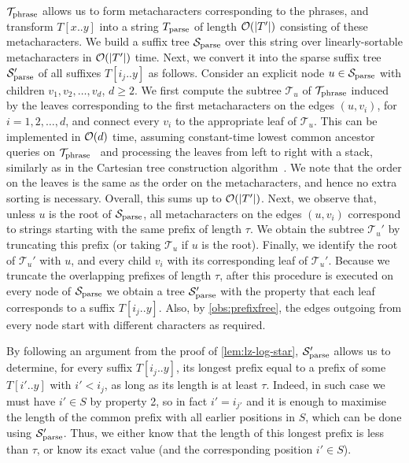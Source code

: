 $\mathcal{T}_{\mathrm{phrase}}$ allows us to form metacharacters corresponding to the phrases, and transform $T[x..y]$ into a string $T_{\mathrm{parse}}$
of length $\mathcal{O}(|T'|)$ consisting of these metacharacters.
We build a suffix tree $\mathcal{S}_{\mathrm{parse}}$ over this
string over linearly-sortable metacharacters in $\mathcal{O}(|T'|)$ time. Next, we convert it into the sparse suffix tree
$\mathcal{S}_{\mathrm{parse}}'$ of all suffixes $T[i_{j}..y]$ as follows. Consider an explicit node $u\in\mathcal{S}_{\mathrm{parse}}$ with children $v_{1},v_{2},\ldots,v_{d}$,
$d\geq 2$. We first compute the subtree $\mathcal{T}_{u}$ of $\mathcal{T}_{\mathrm{phrase}}$ induced by the leaves corresponding to the first metacharacters
on the edges $(u,v_{i})$, for $i=1,2,\ldots,d$, and connect every $v_{i}$ to the appropriate leaf of $\mathcal{T}_{u}$.
This can be implemented in $\mathcal{O}(d)$ time, assuming constant-time lowest common ancestor queries on $\mathcal{T}_{\mathrm{phrase}}$~\cite{BenderF00}
and processing the leaves from left to right with a stack, similarly as in the Cartesian tree construction algorithm~\cite{Vuillemin80}.
We note that the order on the leaves is the same as the order on the metacharacters, and hence no extra sorting is necessary.
Overall, this sums up to $\mathcal{O}(|T'|)$.
Next, we observe that, unless $u$ is the root of $\mathcal{S}_{\mathrm{parse}}$, all metacharacters on the edges $(u,v_{i})$ correspond
to strings starting with the same prefix of length $\tau$. We obtain the subtree $\mathcal{T}_{u}'$ by truncating
this prefix (or taking $\mathcal{T}_{u}$ if $u$ is the root). Finally, we identify the root of $\mathcal{T}_{u}'$
with $u$, and every child $v_{i}$ with its corresponding leaf of $\mathcal{T}_{u}'$.
Because we truncate the overlapping prefixes of length $\tau$, after this procedure is executed on every node
of $\mathcal{S}_{\mathrm{parse}}$ we obtain a tree $\mathcal{S}_{\mathrm{parse}}'$ with the property that each leaf corresponds to a suffix
$T[i_{j}..y]$. Also, by \cref{obs:prefixfree}, the edges outgoing from every node start with different characters
as required.

By following an argument from the proof of \cref{lem:lz-log-star},
$\mathcal{S}_{\mathrm{parse}}'$ allows us to determine, for every suffix $T[i_{j}..y]$, its longest prefix equal to a prefix of some $T[i'..y]$
with $i' < i_{j}$, as long as its length is at least $\tau$. Indeed, in such case we must have $i'\in S$ by property 2,
so in fact $i'=i_{j'}$ and it is enough to maximise the length of the common prefix
with all earlier positions in $S$, which can be done using $\mathcal{S}_{\mathrm{parse}}'$. Thus, we either know that the length of this longest
prefix is less than $\tau$, or know its exact value (and the corresponding position $i'\in S$).


